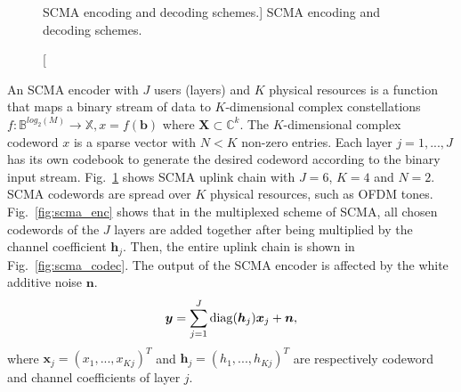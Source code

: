 \begin{figure}[htp]
{
  }
  \caption
    [SCMA encoding and decoding schemes.]
    {SCMA encoding and decoding schemes.}
  \label{fig:scma}
\end{figure}

An SCMA encoder with $J$ users (layers) and $K$ physical resources is a function
that maps a binary stream of data to $K$-dimensional complex constellations
$f : \mathbb{B}^{log_{2}(M)} \rightarrow \mathbb{X}, x = f(\bm{b})$ where
$\bm{X} \subset \mathbb{C}^k$. The $K$-dimensional complex codeword $x$ is a
sparse vector with $N < K$ non-zero entries. Each layer $j=1, ..., J$ has its
own codebook to generate the desired codeword according to the binary input
stream. Fig.~\ref{fig:scma} shows SCMA uplink chain with $J = 6$, $K = 4$ and
$N = 2$. SCMA codewords are spread over $K$ physical resources, such as OFDM
tones. Fig.~\ref{fig:scma_enc} shows that in the multiplexed scheme of SCMA, all
chosen codewords of the $J$ layers are added together after being multiplied by
the channel coefficient $\bm{h}_j$. Then, the entire uplink chain is shown in
Fig.~\ref{fig:scma_codec}. The output of the SCMA encoder is affected by the
white additive noise $\bm{n}$.
\begin{equation}
  \label{eq:scma_1}
  \bm{y} = \sum\limits_{j=1}^J \operatorname{diag}(\bm{h}_j)\bm{x}_j+\bm{n},
\end{equation}
where $\bm{x}_j=(x_1,...,x_{Kj})^T$ and $\bm{h}_j=(h_1,...,h_{Kj})^T$ are
respectively codeword and channel coefficients of layer $j$.

